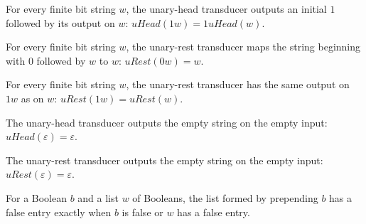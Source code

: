 \begin{theorem}
\label{Complexity.BinArith.uHead_true_cons}
\leanok
{}
For every finite bit string $w$, the unary-head transducer outputs an initial $1$
followed by its output on $w$: $uHead(1w)=1uHead(w)$.
\end{theorem}

\begin{theorem}
\label{Complexity.BinArith.uRest_false_cons}
\leanok
{}
For every finite bit string $w$, the unary-rest transducer maps the string beginning
with $0$ followed by $w$ to $w$: $uRest(0w)=w$.
\end{theorem}

\begin{theorem}
\label{Complexity.BinArith.uRest_true_cons}
\leanok
{}
For every finite bit string $w$, the unary-rest transducer has the same output on $1w$
as on $w$: $uRest(1w)=uRest(w)$.
\end{theorem}

\begin{theorem}
\label{Complexity.BinArith.uHead_nil}
\leanok
{}
The unary-head transducer outputs the empty string on the empty input:
$uHead(\varepsilon)=\varepsilon$.
\end{theorem}

\begin{theorem}
\label{Complexity.BinArith.uRest_nil}
\leanok
{}
The unary-rest transducer outputs the empty string on the empty input:
$uRest(\varepsilon)=\varepsilon$.
\end{theorem}

\begin{theorem}
\label{Complexity.BinArith.hasFalse_cons}
\leanok
{}
For a Boolean $b$ and a list $w$ of Booleans, the list formed by prepending $b$ has a
false entry exactly when $b$ is false or $w$ has a false entry.
\end{theorem}

